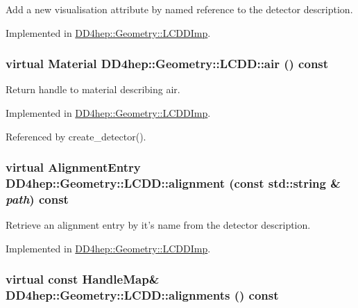 Add a new visualisation attribute by named reference to the detector description. 

Implemented in \hyperlink{class_d_d4hep_1_1_geometry_1_1_l_c_d_d_imp_a6b0b4c0f5d67a156215447e385820dc4}{DD4hep::Geometry::LCDDImp}.\hypertarget{class_d_d4hep_1_1_geometry_1_1_l_c_d_d_a35239d8469cba6c091e970a1baec312b}{
\subsubsection[{air}]{\setlength{\rightskip}{0pt plus 5cm}virtual {\bf Material} DD4hep::Geometry::LCDD::air () const}}
\label{class_d_d4hep_1_1_geometry_1_1_l_c_d_d_a35239d8469cba6c091e970a1baec312b}


Return handle to material describing air. 

Implemented in \hyperlink{class_d_d4hep_1_1_geometry_1_1_l_c_d_d_imp_a7cbfdb3a6fc06844d2a9e4f3d0f52d92}{DD4hep::Geometry::LCDDImp}.

Referenced by create\_\-detector().\hypertarget{class_d_d4hep_1_1_geometry_1_1_l_c_d_d_a5661c5a5c9519f58e3044fa66e5393fa}{
\subsubsection[{alignment}]{\setlength{\rightskip}{0pt plus 5cm}virtual {\bf AlignmentEntry} DD4hep::Geometry::LCDD::alignment (const std::string \& {\em path}) const}}
\label{class_d_d4hep_1_1_geometry_1_1_l_c_d_d_a5661c5a5c9519f58e3044fa66e5393fa}


Retrieve an alignment entry by it's name from the detector description. 

Implemented in \hyperlink{class_d_d4hep_1_1_geometry_1_1_l_c_d_d_imp_af544526d9d90bffac48221b8f77eb265}{DD4hep::Geometry::LCDDImp}.\hypertarget{class_d_d4hep_1_1_geometry_1_1_l_c_d_d_a48553ea87301f9eb1237e41e7e2a0f16}{
\subsubsection[{alignments}]{\setlength{\rightskip}{0pt plus 5cm}virtual const {\bf HandleMap}\& DD4hep::Geometry::LCDD::alignments () const}}
\label{class_d_d4hep_1_1_geometry_1_1_l_c_d_d_a48553ea87301f9eb1237e41e7e2a0f16}


